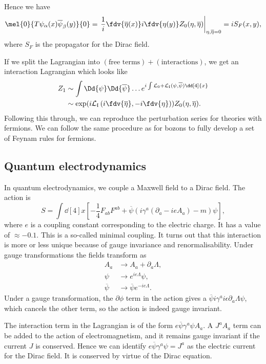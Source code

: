 \documentclass{jknotes} %
\begin{document}
Hence we have
\begin{equation}
    \mel{0}{T\psi_\alpha(x)\overline{\psi}_\beta(y)}{0} = \left.\frac{1}{i}\fdv{\overline{\eta}(x)}i\fdv{\eta(y)}Z_0(\eta,\overline{\eta})\right|_{\eta,\overline{\eta}=0} = iS_F(x,y),
\end{equation}
where \(S_F\) is the propagator for the Dirac field.

If we split the Lagrangian into \((\text{free terms})+(\text{interactions})\), we get an interaction Lagrangian which looks like
\begin{align}
    Z_1 &\sim \int\Dd{\psi}\Dd{\overline{\psi}}\dots e^{i\int \mathcal{L}_0 + \mathcal{L}_{\mathrm{I}}(\psi,\overline{\psi})\dd[4]{x}}\\
        &\sim \exp(i\mathcal{L}_{\mathrm{I}}\left(i\fdv{\overline{\eta}},-i\fdv{\eta}\right))Z_0(\eta,\overline{\eta}).
\end{align}
Following this through, we can reproduce the perturbation series for theories with fermions. We can follow the same procedure as for bozons to fully develop a set of Feynam rules for fermions.

\subsection{Quantum electrodynamics}
In quantum electrodynamics, we couple a Maxwell field to a Dirac field. The action is
\begin{equation}
    S = \int\dd[4]{x}\left[-\frac{1}{4}F_{ab}F^{ab} + \overline{\psi}(i\gamma^a(\partial_a-ieA_a)-m)\psi\right],
\end{equation}
where \(e\) is a coupling constant corresponding to the electric charge. It has a value of \(\approx -0.1\). This is a so-called minimal coupling. It turns out that this interaction is more or less unique because of gauge invariance and renormalisability. Under gauge transformations the fields transform as
\begin{align}
    A_a &\to A_a + \partial_a \Lambda,\\
    \psi &\to e^{ie\Lambda}\psi, \\
    \overline{\psi} &\to \overline{\psi}e^{-ie\Lambda}.
\end{align}
Under a gauge transformation, the \(\partial\phi\) term in the action gives a \(\overline{\psi} i\gamma^a i\epsilon\partial_a\Lambda \psi\), which cancels the other term, so the action is indeed gauge invariant.

The interaction term in the Lagrangian is of the form \(e\overline{\psi}\gamma^a\psi A_a\). A \(J^aA_a\) term can be added to the action of electromagnetism, and it remains gauge invariant if the current \(J\) is conserved. Hence we can identify \(e\overline{\psi}\gamma^a\psi=J^a\) as the electric current for the Dirac field. It is conserved by virtue of the Dirac equation.
\end{document}
